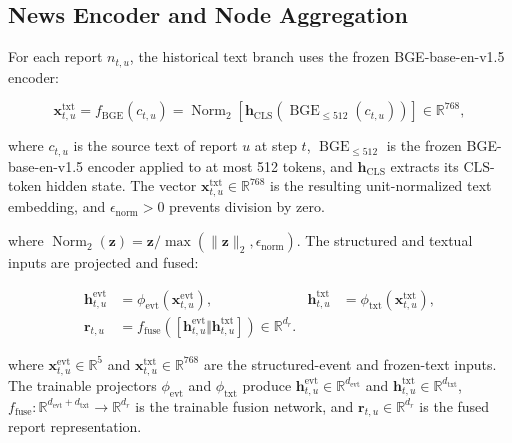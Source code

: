 \documentclass[letterpaper]{article} %
\begin{document}
\subsection{News Encoder and Node Aggregation}
\label{app:news-encoder}

For each report \(n_{t,u}\), the historical text branch uses the frozen BGE-base-en-v1.5 encoder:

\begin{equation}
\mathbf x^{\mathrm{txt}}_{t,u}
=f_{\mathrm{BGE}}(c_{t,u})
=\operatorname{Norm}_2\!\left[
\mathbf h_{\mathrm{CLS}}\!\left(
\operatorname{BGE}_{\leq512}(c_{t,u})
\right)\right]
\in\mathbb R^{768},
\label{eq:app-text-encoding}
\end{equation}

where \(c_{t,u}\) is the source text of report \(u\) at step \(t\), \(\operatorname{BGE}_{\leq512}\) is the frozen BGE-base-en-v1.5 encoder applied to at most 512 tokens, and \(\mathbf h_{\mathrm{CLS}}\) extracts its \(\mathrm{CLS}\)-token hidden state. The vector \(\mathbf x^{\mathrm{txt}}_{t,u}\in\mathbb R^{768}\) is the resulting unit-normalized text embedding, and \(\epsilon_{\mathrm{norm}}>0\) prevents division by zero.

where \(\operatorname{Norm}_2(\mathbf z)=\mathbf z/\max(\lVert\mathbf z\rVert_2,\epsilon_{\mathrm{norm}})\). The structured and textual inputs are projected and fused:

\begin{equation}
\begin{aligned}
\mathbf h^{\mathrm{evt}}_{t,u}
&=\phi_{\mathrm{evt}}(\mathbf x^{\mathrm{evt}}_{t,u}),&
\mathbf h^{\mathrm{txt}}_{t,u}
&=\phi_{\mathrm{txt}}(\mathbf x^{\mathrm{txt}}_{t,u}),\\
\mathbf r_{t,u}
&=f_{\mathrm{fuse}}(
 [\mathbf h^{\mathrm{evt}}_{t,u}\Vert
\mathbf h^{\mathrm{txt}}_{t,u}])
\in\mathbb R^{d_r}.
\end{aligned}
\label{eq:app-news-fusion}
\end{equation}

where \(\mathbf x^{\mathrm{evt}}_{t,u}\in\mathbb R^5\) and \(\mathbf x^{\mathrm{txt}}_{t,u}\in\mathbb R^{768}\) are the structured-event and frozen-text inputs. The trainable projectors \(\phi_{\mathrm{evt}}\) and \(\phi_{\mathrm{txt}}\) produce \(\mathbf h^{\mathrm{evt}}_{t,u}\in\mathbb R^{d_{\mathrm{evt}}}\) and \(\mathbf h^{\mathrm{txt}}_{t,u}\in\mathbb R^{d_{\mathrm{txt}}}\), \(f_{\mathrm{fuse}}:\mathbb R^{d_{\mathrm{evt}}+d_{\mathrm{txt}}}\rightarrow\mathbb R^{d_r}\) is the trainable fusion network, and \(\mathbf r_{t,u}\in\mathbb R^{d_r}\) is the fused report representation.
\end{document}
